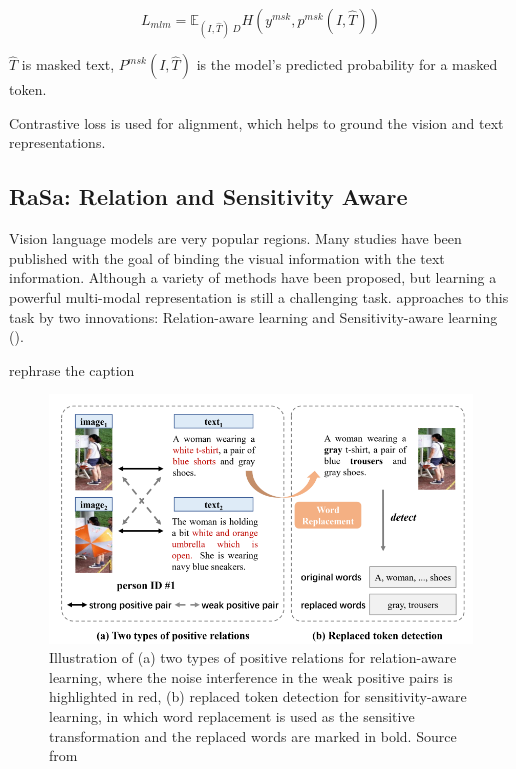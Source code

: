 \begin{displaymath}
    L_{mlm} = \mathbb{E}_{(I,\hat{T})~D}H(y^{msk}, p^{msk}(I,\hat{T}))
\end{displaymath}

$\hat{T}$ is masked text, $P^{msk}(I,\hat{T})$ is the model's predicted probability for a masked token. 

Contrastive loss is used for alignment, which helps to ground the vision and text representations.

\subsection{RaSa: Relation and Sensitivity Aware}

Vision language models are very popular regions. Many studies have been published with the goal of binding the visual information with the text information. Although a variety of methods have been proposed, but learning a powerful multi-modal representation is still a challenging task. \cite{Bai2023RaSaRA} approaches to this task by two innovations: Relation-aware learning and Sensitivity-aware learning (\cite{Bai2023RaSaRA}).

{\color{red}rephrase the caption}
\begin{figure}
    \includegraphics[width=\linewidth]{img/weak_positive_relation.png}
    \caption{Illustration of (a) two types of positive relations for relation-aware learning, where the noise interference in the weak positive pairs is highlighted in red, (b) replaced token detection for sensitivity-aware learning, in which word replacement is used as the sensitive transformation and the replaced words are marked in bold. Source from\cite{Bai2023RaSaRA}}
    \label{img:rasa}
\end{figure}

